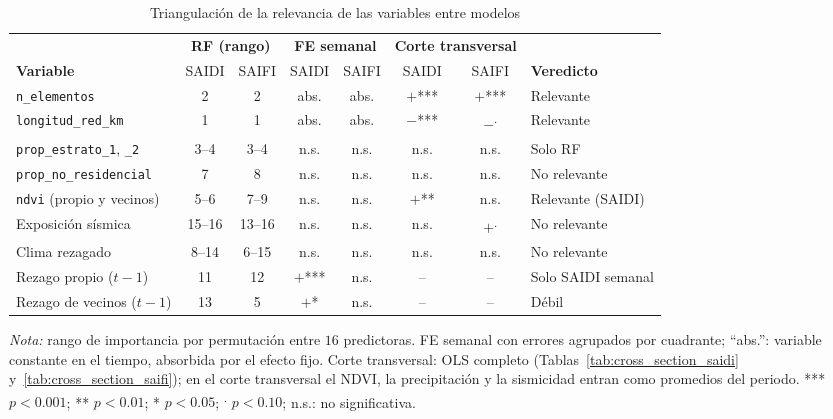 \begin{table}[!htbp]
\centering
\footnotesize
\setlength{\tabcolsep}{3.5pt}
\caption{Triangulación de la relevancia de las variables entre modelos}
\label{tab:triangulacion}
\begin{tabular}{@{}>{\raggedright\arraybackslash}p{3.6cm} c c c c c c >{\raggedright\arraybackslash}p{2.0cm}@{}}
\toprule
& \multicolumn{2}{c}{\textbf{RF (rango)}} & \multicolumn{2}{c}{\textbf{FE semanal}} & \multicolumn{2}{c}{\textbf{Corte transversal}} & \\
\cmidrule(lr){2-3}\cmidrule(lr){4-5}\cmidrule(lr){6-7}
\textbf{Variable} & SAIDI & SAIFI & SAIDI & SAIFI & SAIDI & SAIFI & \textbf{Veredicto} \\
\midrule
\texttt{n\_elementos}            & 2 & 2 & abs. & abs. & $+$*** & $+$*** & Relevante \\
\texttt{longitud\_red\_km}       & 1 & 1 & abs. & abs. & $-$*** & $-$\textsuperscript{.} & Relevante \\
\texttt{prop\_estrato\_1}, \texttt{\_2} & 3--4 & 3--4 & n.s. & n.s. & n.s. & n.s. & Solo RF \\
\texttt{prop\_no\_residencial}   & 7 & 8 & n.s. & n.s. & n.s. & n.s. & No relevante \\
\texttt{ndvi} (propio y vecinos) & 5--6 & 7--9 & n.s. & n.s. & $+$** & n.s. & Relevante (SAIDI) \\
Exposición sísmica               & 15--16 & 13--16 & n.s. & n.s. & n.s. & $+$\textsuperscript{.} & No relevante \\
Clima rezagado                   & 8--14 & 6--15 & n.s. & n.s. & n.s. & n.s. & No relevante \\
Rezago propio ($t-1$)            & 11 & 12 & $+$*** & n.s. & -- & -- & Solo SAIDI semanal \\
Rezago de vecinos ($t-1$)        & 13 & 5 & $+$* & n.s. & -- & -- & Débil \\
\bottomrule
\end{tabular}

\vspace{2pt}
\noindent\footnotesize\textit{Nota:} rango de importancia por permutación entre $16$ predictoras. FE semanal con errores agrupados por cuadrante; ``abs.'': variable constante en el tiempo, absorbida por el efecto fijo. Corte transversal: OLS completo (Tablas~\ref{tab:cross_section_saidi} y~\ref{tab:cross_section_saifi}); en el corte transversal el NDVI, la precipitación y la sismicidad entran como promedios del periodo. *** $p<0{.}001$; ** $p<0{.}01$; * $p<0{.}05$; \textsuperscript{.} $p<0{.}10$; n.s.: no significativa.
\end{table}

